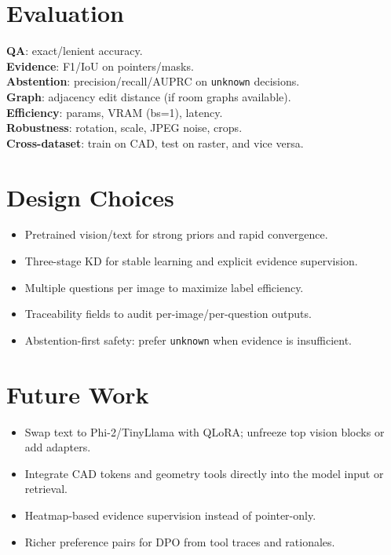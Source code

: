 \documentclass[11pt]{article}
\begin{document}
\section{Evaluation}
\textbf{QA}: exact/lenient accuracy.\\
\textbf{Evidence}: F1/IoU on pointers/masks.\\
\textbf{Abstention}: precision/recall/AUPRC on \texttt{unknown} decisions.\\
\textbf{Graph}: adjacency edit distance (if room graphs available).\\
\textbf{Efficiency}: params, VRAM (bs=1), latency.\\
\textbf{Robustness}: rotation, scale, JPEG noise, crops.\\
\textbf{Cross-dataset}: train on CAD, test on raster, and vice versa.

\section{Design Choices}
\begin{itemize}
    \item Pretrained vision/text for strong priors and rapid convergence.
    \item Three-stage KD for stable learning and explicit evidence supervision.
    \item Multiple questions per image to maximize label efficiency.
    \item Traceability fields to audit per-image/per-question outputs.
    \item Abstention-first safety: prefer \texttt{unknown} when evidence is insufficient.
\end{itemize}

\section{Future Work}
\begin{itemize}
    \item Swap text to Phi-2/TinyLlama with QLoRA; unfreeze top vision blocks or add adapters.
    \item Integrate CAD tokens and geometry tools directly into the model input or retrieval.
    \item Heatmap-based evidence supervision instead of pointer-only.
    \item Richer preference pairs for DPO from tool traces and rationales.
\end{itemize}
\end{document}
